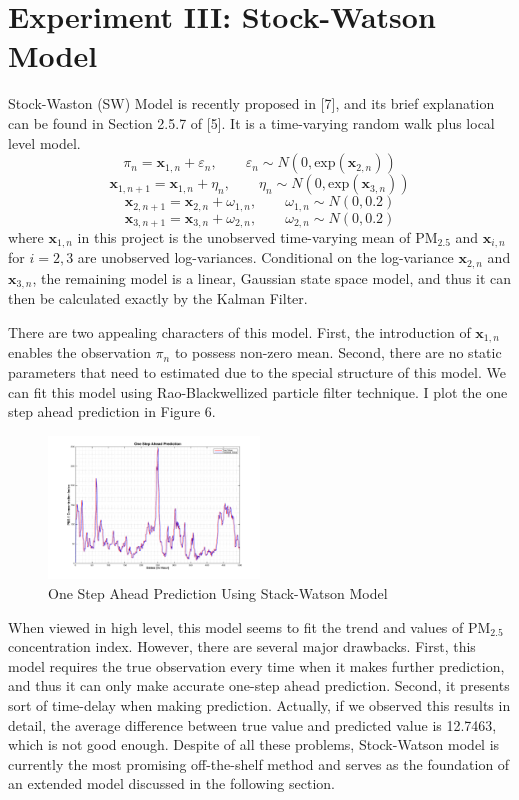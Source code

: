 \documentclass[letterpaper]{article}
\begin{document}
\section{Experiment III: Stock-Watson Model}
Stock-Waston (SW) Model is recently proposed in [7], and its brief explanation can be found in Section 2.5.7 of [5]. It is a time-varying random walk plus local level model. 
$$ \pi_{n} = \mathbf{x}_{1,n} + \varepsilon_{n}, \qquad \varepsilon_{n} \sim N(0, \text{exp}(\mathbf{x}_{2,n}) ) $$
$$ \mathbf{x}_{1,n+1} = \mathbf{x}_{1,n} + \eta_{n}, \qquad \eta_{n} \sim N(0, \text{exp}(\mathbf{x}_{3,n}) ) $$
$$ \mathbf{x}_{2,n+1} = \mathbf{x}_{2,n} + \omega_{1,n}, \qquad \omega_{1,n} \sim N(0, 0.2)  $$
$$ \mathbf{x}_{3,n+1} = \mathbf{x}_{3,n} + \omega_{2,n}, \qquad \omega_{2,n} \sim N(0, 0.2)  $$
\noindent where $\mathbf{x}_{1,n}$ in this project is the unobserved time-varying mean of $\text{PM}_{2.5}$ and $\mathbf{x}_{i,n}$ for $i = 2, 3$ are unobserved log-variances. Conditional on the log-variance $\mathbf{x}_{2,n}$ and $\mathbf{x}_{3,n}$, the remaining model is a linear, Gaussian state space model, and thus it can then be calculated exactly by the Kalman Filter. 

There are two appealing characters of this model. First, the introduction of $\mathbf{x}_{1,n}$ enables the observation $\pi_{n}$ to possess non-zero mean. Second, there are no static parameters that need to estimated due to the special structure of this model. We can fit this model using Rao-Blackwellized particle filter technique. I plot the one step ahead prediction in Figure 6. 

\begin{figure}[htbp]
	\centerline{\includegraphics[width=0.50\textwidth]{PM25_onestep.pdf}}
	\caption{One Step Ahead Prediction Using Stack-Watson Model}\label{fig:digit}
\end{figure}

When viewed in high level, this model seems to fit the trend and values of $\text{PM}_{2.5}$ concentration index. However, there are several major drawbacks. First, this model requires the true observation every time when it makes further prediction, and thus it can only make accurate one-step ahead prediction. Second, it presents sort of time-delay when making prediction. Actually, if we observed this results in detail, the average difference between true value and predicted value is 12.7463, which is not good enough. Despite of all these problems, Stock-Watson model is currently the most promising off-the-shelf method and serves as the foundation of an extended model discussed in the following section.
\end{document}
